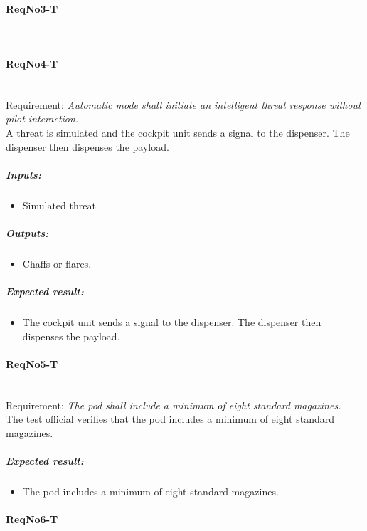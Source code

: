 \paragraph{ReqNo3-T}\mbox{}\\ %


\paragraph{ReqNo4-T}\mbox{}\\ %
Requirement: \textit{Automatic mode shall initiate an intelligent threat response without pilot interaction.}\\
A threat is simulated and the cockpit unit sends a signal to the dispenser. The dispenser then dispenses the payload.
\\
	\subparagraph{Inputs:}
	\begin{itemize}
	\item Simulated threat
	\end{itemize}
	\subparagraph{Outputs:}
	\begin{itemize}
	\item Chaffs or flares.
	\end{itemize}
	\subparagraph{Expected result:}
	\begin{itemize}
	\item The cockpit unit sends a signal to the dispenser. The dispenser then dispenses the payload.
	\end{itemize}



\paragraph{ReqNo5-T}\mbox{}\\ %
Requirement: \textit{The pod shall include a minimum of eight standard magazines.}\\

The test official verifies that the pod includes a minimum of eight standard magazines.

\subparagraph{Expected result:}
	\begin{itemize}
	\item The pod includes a minimum of eight standard magazines.
	\end{itemize}

\paragraph{ReqNo6-T}\mbox{}\\ %

